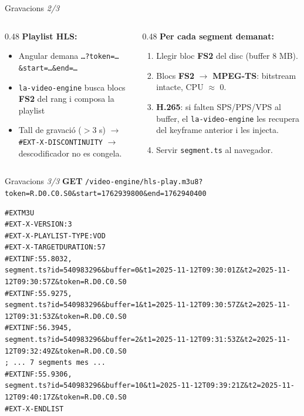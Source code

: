 \begin{frame}{Gravacions \small\textit{2/3}}
  \begin{columns}[T]
    \begin{column}{0.48\textwidth}
      \textbf{Playlist HLS:}
      \begin{itemize}
        \item Angular demana \texttt{\ldots?token=\ldots\&start=\ldots\&end=\ldots}
        \item \texttt{la-video-engine} busca blocs \textbf{FS2} del rang i composa la playlist
        \item Tall de gravació ($>$3 s) $\to$ \texttt{\#EXT-X-DISCONTINUITY} $\to$ descodificador no es congela.
      \end{itemize}

      \vspace{0.8em}
    \end{column}

    \begin{column}{0.48\textwidth}
      \textbf{Per cada segment demanat:}
      \begin{enumerate}
        \item Llegir bloc \textbf{FS2} del disc (buffer 8 MB).
        \item Blocs \textbf{FS2} $\to$ \textbf{MPEG-TS}: bitstream intacte, CPU $\approx$ 0.
        \item \textbf{H.265}: si falten SPS/PPS/VPS al buffer, el \texttt{la-video-engine} les recupera del keyframe anterior i les injecta.
        \item Servir \texttt{segment.ts} al navegador.
      \end{enumerate}
    \end{column}
  \end{columns}
\end{frame}

\begin{frame}[fragile]{Gravacions \small\textit{3/3}}
  \small\textbf{GET} \texttt{\small /video-engine/hls-play.m3u8?token=R.D0.C0.S0\&start=1762939800\&end=1762940400}

  \vspace{0.3em}
  \begin{lstlisting}[style=jsonbox]
#EXTM3U
#EXT-X-VERSION:3
#EXT-X-PLAYLIST-TYPE:VOD
#EXT-X-TARGETDURATION:57
#EXTINF:55.8032,
segment.ts?id=540983296&buffer=0&t1=2025-11-12T09:30:01Z&t2=2025-11-12T09:30:57Z&token=R.D0.C0.S0
#EXTINF:55.9275,
segment.ts?id=540983296&buffer=1&t1=2025-11-12T09:30:57Z&t2=2025-11-12T09:31:53Z&token=R.D0.C0.S0
#EXTINF:56.3945,
segment.ts?id=540983296&buffer=2&t1=2025-11-12T09:31:53Z&t2=2025-11-12T09:32:49Z&token=R.D0.C0.S0
; ... 7 segments mes ...
#EXTINF:55.9306,
segment.ts?id=540983296&buffer=10&t1=2025-11-12T09:39:21Z&t2=2025-11-12T09:40:17Z&token=R.D0.C0.S0
#EXT-X-ENDLIST
  \end{lstlisting}
\end{frame}

